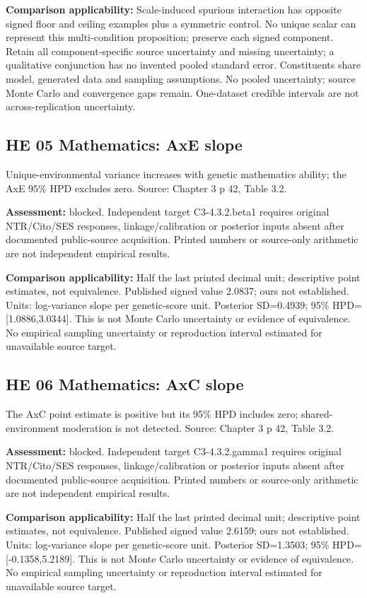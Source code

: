 \documentclass[11pt]{article}
\begin{document}
\textbf{Comparison applicability:} Scale-induced spurious interaction has opposite signed floor and ceiling examples plus a symmetric control. No unique scalar can represent this multi-condition proposition; preserve each signed component. Retain all component-specific source uncertainty and missing uncertainty; a qualitative conjunction has no invented pooled standard error. Constituents share model, generated data and sampling assumptions. No pooled uncertainty; source Monte Carlo and convergence gaps remain. One-dataset credible intervals are not across-replication uncertainty.
\subsection{HE 05 Mathematics: AxE slope}\label{head:HE05}
Unique-environmental variance increases with genetic mathematics ability; the AxE 95\% HPD excludes zero. Source: Chapter 3 p 42, Table 3.2.

\textbf{Assessment:} blocked. Independent target C3-4.3.2.beta1 requires original NTR/Cito/SES responses, linkage/calibration or posterior inputs absent after documented public-source acquisition. Printed numbers or source-only arithmetic are not independent empirical results.

\textbf{Comparison applicability:} Half the last printed decimal unit; descriptive point estimates, not equivalence. Published signed value 2.0837; ours not established. Units: log-variance slope per genetic-score unit. Posterior SD=0.4939; 95\% HPD=[1.0886,3.0344]. This is not Monte Carlo uncertainty or evidence of equivalence. No empirical sampling uncertainty or reproduction interval estimated for unavailable source target.
\subsection{HE 06 Mathematics: AxC slope}\label{head:HE06}
The AxC point estimate is positive but its 95\% HPD includes zero; shared-environment moderation is not detected. Source: Chapter 3 p 42, Table 3.2.

\textbf{Assessment:} blocked. Independent target C3-4.3.2.gamma1 requires original NTR/Cito/SES responses, linkage/calibration or posterior inputs absent after documented public-source acquisition. Printed numbers or source-only arithmetic are not independent empirical results.

\textbf{Comparison applicability:} Half the last printed decimal unit; descriptive point estimates, not equivalence. Published signed value 2.6159; ours not established. Units: log-variance slope per genetic-score unit. Posterior SD=1.3503; 95\% HPD=[-0.1358,5.2189]. This is not Monte Carlo uncertainty or evidence of equivalence. No empirical sampling uncertainty or reproduction interval estimated for unavailable source target.
\end{document}

